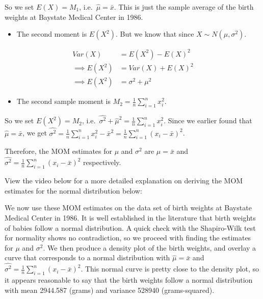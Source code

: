 \documentclass[
]{book}
\newenvironment{Shaded}{\begin{snugshade}}{\end{snugshade}}
\newcommand{\DocumentationTok}[1]{\textcolor[rgb]{0.56,0.35,0.01}{\textbf{\textit{#1}}}}
\newcommand{\FunctionTok}[1]{\textcolor[rgb]{0.13,0.29,0.53}{\textbf{#1}}}
\newcommand{\NormalTok}[1]{#1}
\newcommand{\OtherTok}[1]{\textcolor[rgb]{0.56,0.35,0.01}{#1}}
\newcommand{\SpecialCharTok}[1]{\textcolor[rgb]{0.81,0.36,0.00}{\textbf{#1}}}
\providecommand{\tightlist}{%
  \setlength{\itemsep}{0pt}\setlength{\parskip}{0pt}}
\begin{document}
So we set \(E(X) = M_1\), i.e.~\(\hat{\mu} = \bar{x}\). This is just the sample average of the birth weights at Baystate Medical Center in 1986.

\begin{itemize}
\tightlist
\item
  The second moment is \(E(X^2)\). But we know that since \(X \sim N(\mu, \sigma^2)\).
\end{itemize}

\[
\begin{split}
Var(X) &= E(X^2) - E(X)^2\\
\implies E(X^2) &= Var(X) + E(X)^2 \\
\implies E(X^2) &= \sigma^2 + \mu^2
\end{split}
\]

\begin{itemize}
\tightlist
\item
  The second sample moment is \(M_2 = \frac{1}{n} \sum_{i=1}^n x_i^2\).
\end{itemize}

So we set \(E(X^2) = M_2\), i.e.~\(\hat{\sigma^2} + \hat{\mu}^2 = \frac{1}{n} \sum_{i=1}^n x_i^2\). Since we earlier found that \(\hat{\mu} = \bar{x}\), we get \(\hat{\sigma^2}  = \frac{1}{n} \sum_{i=1}^n x_i^2 - \bar{x}^2 = \frac{1}{n} \sum_{i=1}^n (x_i - \bar{x})^2\).

Therefore, the MOM estimates for \(\mu\) and \(\sigma^2\) are \(\hat{\mu} = \bar{x}\) and \(\hat{\sigma^2}  = \frac{1}{n} \sum_{i=1}^n (x_i - \bar{x})^2\) respectively.

View the video below for a more detailed explanation on deriving the MOM estimates for the normal distribution below:

We now use these MOM estimates on the data set of birth weights at Baystate Medical Center in 1986. It is well established in the literature that birth weights of babies follow a normal distribution. A quick check with the Shapiro-Wilk test for normality shows no contradiction, so we proceed with finding the estimates for \(\mu\) and \(\sigma^2\). We then produce a density plot of the birth weights, and overlay a curve that corresponds to a normal distribution with \(\hat{\mu} = \bar{x}\) and \(\hat{\sigma^2}  = \frac{1}{n} \sum_{i=1}^n (x_i - \bar{x})^2\). This normal curve is pretty close to the density plot, so it appears reasonable to say that the birth weights follow a normal distribution with mean 2944.587 (grams) and variance 528940 (grams-squared).

\begin{Shaded}
\end{Shaded}
\end{document}
